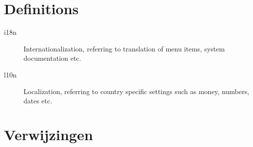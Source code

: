 \documentclass[a4paper,11pt]{article}
\begin{document}
\appendix
\section{Definitions}

\begin{description}
 \item[i18n] Internationalization, referring to translation of menu items, system documentation etc.
 \item[l10n] Localization, referring to country specific settings such as money, numbers, dates etc.
\end{description}
\section{Verwijzingen}


\end{document}
